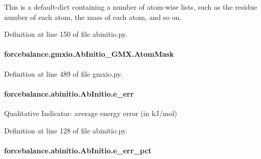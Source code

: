 This is a default-\/dict containing a number of atom-\/wise lists, such as the residue number of each atom, the mass of each atom, and so on. 



Definition at line 150 of file abinitio.\-py.

\hypertarget{classforcebalance_1_1gmxio_1_1AbInitio__GMX_a1ba04a104c0a2e1bafdf3281c95bac72}{
\paragraph[{Atom\-Mask}]{\setlength{\rightskip}{0pt plus 5cm}forcebalance.\-gmxio.\-Ab\-Initio\-\_\-\-G\-M\-X.\-Atom\-Mask}}\label{classforcebalance_1_1gmxio_1_1AbInitio__GMX_a1ba04a104c0a2e1bafdf3281c95bac72}


Definition at line 489 of file gmxio.\-py.

\hypertarget{classforcebalance_1_1abinitio_1_1AbInitio_aa569290969858e189935b3de37ead3f0}{
\paragraph[{e\-\_\-err}]{\setlength{\rightskip}{0pt plus 5cm}forcebalance.\-abinitio.\-Ab\-Initio.\-e\-\_\-err\hspace{0.3cm}{\ttfamily [inherited]}}}\label{classforcebalance_1_1abinitio_1_1AbInitio_aa569290969858e189935b3de37ead3f0}


Qualitative Indicator\-: average energy error (in k\-J/mol) 



Definition at line 128 of file abinitio.\-py.

\hypertarget{classforcebalance_1_1abinitio_1_1AbInitio_a4e3e525a03ab55bc004ebf0e3a0d60ce}{
\paragraph[{e\-\_\-err\-\_\-pct}]{\setlength{\rightskip}{0pt plus 5cm}forcebalance.\-abinitio.\-Ab\-Initio.\-e\-\_\-err\-\_\-pct\hspace{0.3cm}{\ttfamily [inherited]}}}\label{classforcebalance_1_1abinitio_1_1AbInitio_a4e3e525a03ab55bc004ebf0e3a0d60ce}


